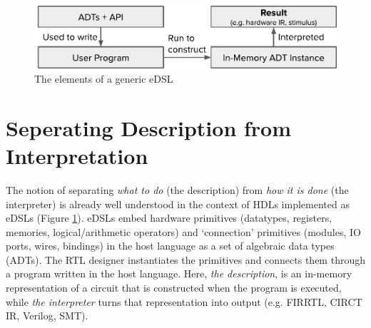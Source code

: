 \documentclass[sigplan,review,nonacm,9pt]{acmart}
\begin{document}

\maketitle

\vspace{-0.5cm}
\begin{figure}[h]
\includegraphics[width=\linewidth]{simcommand/functional_apis.pdf}
\caption{The elements of a generic eDSL}
\label{fig:functional_apis}
\end{figure}
\vspace{-0.5cm}

\section{Seperating Description from Interpretation}


The notion of separating \textit{what to do} (the description) from \textit{how it is done} (the interpreter) is already well understood in the context of HDLs implemented as eDSLs (Figure \ref{fig:functional_apis}).
eDSLs embed hardware primitives (datatypes, registers, memories, logical/arithmetic operators) and `connection' primitives (modules, IO ports, wires, bindings) in the host language as a set of algebraic data types (ADTs).
The RTL designer instantiates the primitives and connects them through a program written in the host language.
Here, \textit{the description}, is an in-memory representation of a circuit that is constructed when the program is executed, while \textit{the interpreter} turns that representation into output (e.g. FIRRTL\cite{firrtl}, CIRCT IR\cite{circt}, Verilog, SMT).
\end{document}
